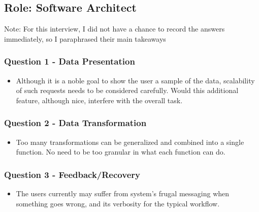 \documentclass[12pt,letterpaper]{article}
\begin{document}
\subsection*{Role: Software Architect}

Note: For this interview, I did not have a chance to record the answers immediately, so I paraphrased their main takeaways
\subsubsection*{Question 1 - Data Presentation}

\begin{itemize}
    \item Although it is a noble goal to show the user a sample of the data, scalability of such requests needs to be considered carefully. Would this additional feature, although nice, interfere with the overall task.  
\end{itemize}

\subsubsection*{Question 2 - Data Transformation}
\begin{itemize}
    \item Too many transformations can be generalized and combined into a single function. No need to be too granular in what each function can do.  
\end{itemize}

\subsubsection*{Question 3 - Feedback/Recovery}
\begin{itemize}
    \item The users currently may suffer from system's frugal messaging when something goes wrong, and its verbosity for the typical workflow.
\end{itemize}
\end{document}

